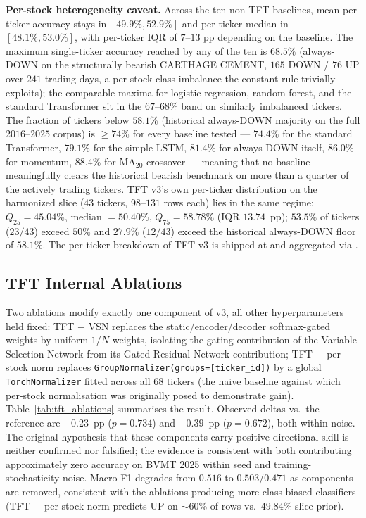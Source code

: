 \documentclass[conference]{IEEEtran}
\begin{document}
\textbf{Per-stock heterogeneity caveat.} Across the ten non-TFT baselines, mean per-ticker accuracy stays in $[49.9\%, 52.9\%]$ and per-ticker median in $[48.1\%, 53.0\%]$, with per-ticker IQR of $7$--$13$ pp depending on the baseline. The maximum single-ticker accuracy reached by any of the ten is $68.5\%$ (always-DOWN on the structurally bearish CARTHAGE CEMENT, $165$ DOWN / $76$ UP over $241$ trading days, a per-stock class imbalance the constant rule trivially exploits); the comparable maxima for logistic regression, random forest, and the standard Transformer sit in the $67$--$68\%$ band on similarly imbalanced tickers. The fraction of tickers below $58.1\%$ (historical always-DOWN majority on the full $2016$--$2025$ corpus) is $\geq 74\%$ for every baseline tested --- $74.4\%$ for the standard Transformer, $79.1\%$ for the simple LSTM, $81.4\%$ for always-DOWN itself, $86.0\%$ for momentum, $88.4\%$ for MA$_{20}$ crossover --- meaning that no baseline meaningfully clears the historical bearish benchmark on more than a quarter of the actively trading tickers. TFT v3's own per-ticker distribution on the harmonized slice ($43$ tickers, $98$--$131$ rows each) lies in the same regime: $Q_{25}\!=\!45.04\%$, median $\!=\!50.40\%$, $Q_{75}\!=\!58.78\%$ (IQR $13.74$~pp); $53.5\%$ of tickers ($23/43$) exceed $50\%$ and $27.9\%$ ($12/43$) exceed the historical always-DOWN floor of $58.1\%$. The per-ticker breakdown of TFT v3 is shipped at  and aggregated via .

\subsection{TFT Internal Ablations}\label{sec:tft_ablations}

Two ablations modify exactly one component of v3, all other hyperparameters held fixed: TFT $-$ VSN replaces the static/encoder/decoder softmax-gated weights by uniform $1/N$ weights, isolating the gating contribution of the Variable Selection Network from its Gated Residual Network contribution; TFT $-$ per-stock norm replaces \texttt{GroupNormalizer(groups=[ticker\_id])} by a global \texttt{TorchNormalizer} fitted across all $68$ tickers (the naive baseline against which per-stock normalisation was originally posed to demonstrate gain). Table~\ref{tab:tft_ablations} summarises the result. Observed deltas vs.\ the reference are $-0.23$~pp ($p = 0.734$) and $-0.39$~pp ($p = 0.672$), both within noise. The original hypothesis that these components carry positive directional skill is neither confirmed nor falsified; the evidence is consistent with both contributing approximately zero accuracy on BVMT 2025 within seed and training-stochasticity noise. Macro-F1 degrades from $0.516$ to $0.503$/$0.471$ as components are removed, consistent with the ablations producing more class-biased classifiers (TFT $-$ per-stock norm predicts UP on $\sim\!60\%$ of rows vs.\ $49.84\%$ slice prior).
\end{document}
